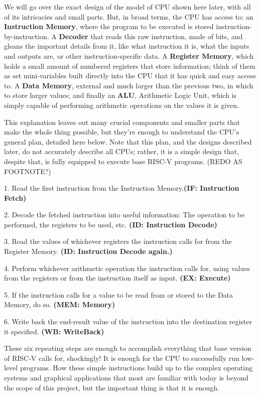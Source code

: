 \documentclass[12pt,twoside]{reedthesis}
\begin{document}
We will go over the exact design of the model of CPU shown here later, with all of its intricacies and small parts. But, in broad terms, the CPU has access to: an \textbf{Instruction Memory}, where the program to be executed is stored instruction-by-instruction. A \textbf{Decoder} that reads this raw instruction, made of bits, and gleans the important details from it, like what instruction it is, what the inputs and outputs are, or other instruction-specific data. A \textbf{Register Memory}, which holds a small amount of numbered registers that store information; think of them as set mini-variables built directly into the CPU that it has quick and easy access to. A \textbf{Data Memory}, external and much larger than the previous two, in which to store larger values; and finally an \textbf{ALU}, Arithmetic Logic Unit, which is simply capable of performing arithmetic operations on the values it is given.

This explanation leaves out many crucial components and smaller parts that make the whole thing possible, but they're enough to understand the CPU's general plan, detailed here below. Note that this plan, and the designs described later, do not accurately describe all CPUs; rather, it is a simple design that, despite that, is fully equipped to execute base RISC-V programs. (REDO AS FOOTNOTE?)

1. Read the first instruction from the Instruction Memory.\textbf{(IF: Instruction Fetch)}

2. Decode the fetched instruction into useful information: The operation to be performed, the registers to be used, etc. \textbf{(ID: Instruction Decode)}

3. Read the values of whichever registers the instruction calls for from the Register Memory. \textbf{(ID: Instruction Decode again.)}

4. Perform whichever arithmetic operation the instruction calls for, using values from the registers or from the instruction itself as input. \textbf{(EX: Execute)}

5. If the instruction calls for a value to be read from or stored to the Data Memory, do so. \textbf{(MEM: Memory)}

6. Write back the end-result value of the instruction into the destination register it specified. \textbf{(WB: WriteBack)}

These six repeating steps are enough to accomplish everything that base version of RISC-V calls for, shockingly! It is enough for the CPU to successfully run low-level programs. How these simple instructions build up to the complex operating systems and graphical applications that most are familiar with today is beyond the scope of this project, but the important thing is that it is enough.
\end{document}
